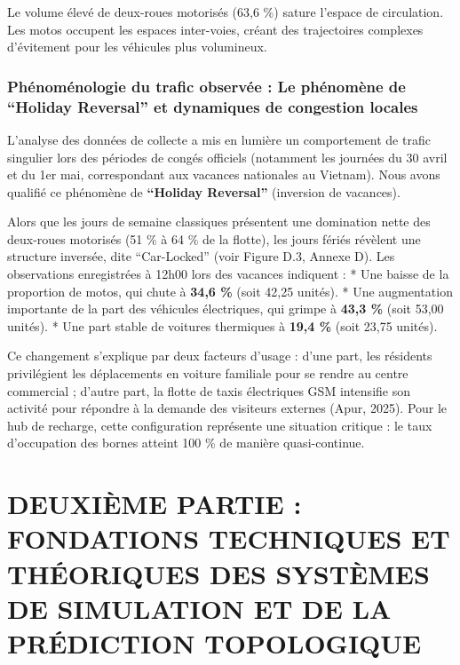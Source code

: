 \documentclass[10pt, a4paper]{article}
\begin{document}
Le volume élevé de deux-roues motorisés (63,6 \%) sature l'espace de
circulation. Les motos occupent les espaces inter-voies, créant des
trajectoires complexes d'évitement pour les véhicules plus volumineux.

\subsubsection{Phénoménologie du trafic observée : Le phénomène de
``Holiday Reversal'' et dynamiques de congestion
locales}\label{phuxe9nomuxe9nologie-du-trafic-observuxe9e-le-phuxe9nomuxe8ne-de-holiday-reversal-et-dynamiques-de-congestion-locales}

L'analyse des données de collecte a mis en lumière un comportement de
trafic singulier lors des périodes de congés officiels (notamment les
journées du 30 avril et du 1er mai, correspondant aux vacances
nationales au Vietnam). Nous avons qualifié ce phénomène de
\textbf{``Holiday Reversal''} (inversion de vacances).

Alors que les jours de semaine classiques présentent une domination
nette des deux-roues motorisés (51 \% à 64 \% de la flotte), les jours
fériés révèlent une structure inversée, dite ``Car-Locked'' (voir Figure
D.3, Annexe D). Les observations enregistrées à 12h00 lors des vacances
indiquent : * Une baisse de la proportion de motos, qui chute à
\textbf{34,6 \%} (soit 42,25 unités). * Une augmentation importante de
la part des véhicules électriques, qui grimpe à \textbf{43,3 \%} (soit
53,00 unités). * Une part stable de voitures thermiques à \textbf{19,4
\%} (soit 23,75 unités).

Ce changement s'explique par deux facteurs d'usage : d'une part, les
résidents privilégient les déplacements en voiture familiale pour se
rendre au centre commercial ; d'autre part, la flotte de taxis
électriques GSM intensifie son activité pour répondre à la demande des
visiteurs externes (Apur, 2025). Pour le hub de recharge, cette
configuration représente une situation critique : le taux d'occupation
des bornes atteint 100 \% de manière quasi-continue.

\newpage

\section{DEUXIÈME PARTIE : FONDATIONS TECHNIQUES ET THÉORIQUES DES
SYSTÈMES DE SIMULATION ET DE LA PRÉDICTION
TOPOLOGIQUE}\label{deuxiuxe8me-partie-fondations-techniques-et-thuxe9oriques-des-systuxe8mes-de-simulation-et-de-la-pruxe9diction-topologique}
\end{document}
